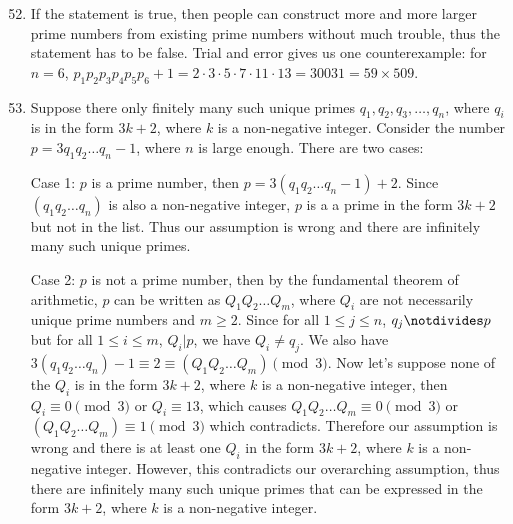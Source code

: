 \documentclass{article}
\begin{document}
\begin{enumerate}
    \setcounter{enumi}{51}
    \item If the statement is true, then people can construct more and more larger prime numbers from existing prime numbers without much trouble, thus the statement has to be false. Trial and error gives us one counterexample: for $n = 6$, $p_1p_2p_3p_4p_5p_6+1 = 2\cdot3\cdot5\cdot7\cdot11\cdot13 = 30031 = 59\times 509$.
    
    \setcounter{enumi}{53}
    \item Suppose there only finitely many such unique primes $q_1,q_2,q_3,\dots,q_n$, where $q_i$ is in the form $3k+2$, where $k$ is a non-negative integer. Consider the number $p = 3q_1q_2\dots q_n-1$, where $n$ is large enough. There are two cases:
    
    Case 1: $p$ is a prime number, then $p = 3(q_1q_2\dots q_n-1)+2$. Since $(q_1q_2\dots q_n)$ is also a non-negative integer, $p$ is a a prime in the form $3k+2$ but not in the list. Thus our assumption is wrong and there are infinitely many such unique primes.
    
    Case 2: $p$ is not a prime number, then by the fundamental theorem of arithmetic, $p$ can be written as $Q_1Q_2\dots Q_m$, where $Q_i$ are not necessarily unique prime numbers and $m \geq 2$. Since for all $1\leq j \leq n$, $q_j \notdivides p$ but for all $1 \leq i \leq m$, $Q_i | p$, we have $Q_i \neq q_j$. We also have $3(q_1q_2\dots q_n)-1 \equiv 2 \equiv (Q_1Q_2\dots Q_m) \pmod{3}$. Now let's suppose none of the $Q_i$ is in the form $3k+2$, where $k$ is a non-negative integer, then $Q_i \equiv 0 \pmod{3}$ or $Q_i \equiv 1{3}$, which causes $Q_1Q_2\dots Q_m \equiv 0\pmod{3}$ or $(Q_1Q_2\dots Q_m) \equiv 1\pmod{3}$ which contradicts. Therefore our assumption is wrong and there is at least one $Q_i$ in the form $3k+2$, where $k$ is a non-negative integer. However, this contradicts our overarching assumption, thus there are infinitely many such unique primes that can be expressed in the form $3k+2$, where $k$ is a non-negative integer.
\end{enumerate}
\end{document}
